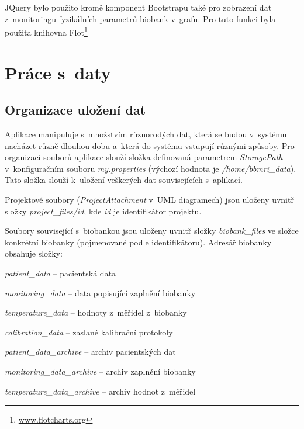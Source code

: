 \documentclass[11pt, draft, oneside]{fithesis2}
\begin{document}
JQuery bylo použito kromě komponent Bootstrapu také pro zobrazení dat z~monitoringu fyzikálních parametrů biobank v~grafu. Pro tuto funkci byla použita knihovna Flot\footnote{\url{www.flotcharts.org}} 


\section{Práce s~daty}

\subsection{Organizace uložení dat}\label{chapter:implementation:subsection:organizationOfDataStorage}
Aplikace manipuluje s~množstvím různorodých dat, která se budou v~systému nacházet různě dlouhou dobu a~která do systému vstupují různými způsoby. Pro organizaci souborů aplikace slouží složka definovaná parametrem \textit{StoragePath} v~konfiguračním souboru \textit{my.properties} (výchozí hodnota je \textit{/home/bbmri\_data}). Tato složka slouží k~uložení veškerých dat souvisejících s~aplikací.

Projektové soubory (\textit{ProjectAttachment} v~UML diagramech) jsou uloženy uvnitř složky \textit{project\_files/id}, kde \textit{id} je identifikátor projektu. 

Soubory související s~biobankou jsou uloženy uvnitř složky \textit{biobank\_files} ve složce konkrétní biobanky (pojmenované podle identifikátoru). Adresář biobanky obsahuje složky: 
\begin{compactitem}
	\item \textit{patient\_data} -- pacientská data
	\item \textit{monitoring\_data} -- data popisující zaplnění biobanky
	\item \textit{temperature\_data} -- hodnoty z~měřidel z~biobanky
	\item \textit{calibration\_data} -- zaslané kalibrační protokoly
	\item \textit{patient\_data\_archive} -- archiv pacientských dat
	\item \textit{monitoring\_data\_archive} -- archiv zaplnění biobanky
	\item \textit{temperature\_data\_archive} -- archiv hodnot z~měřidel
\end{compactitem}
\end{document}
